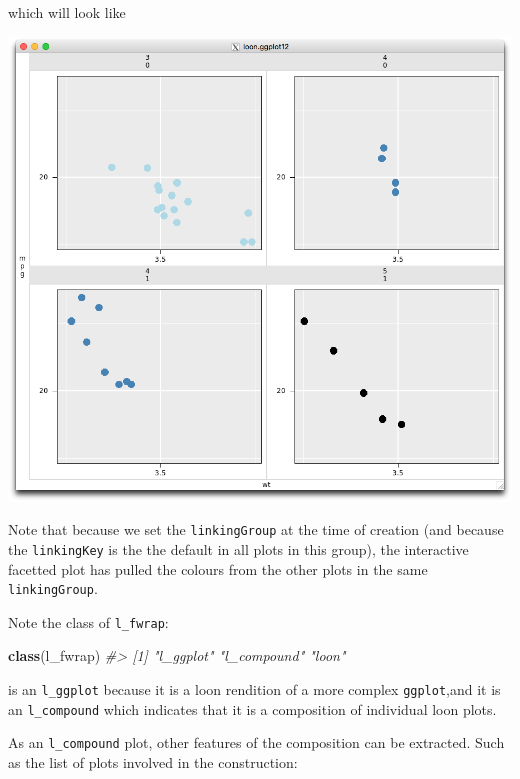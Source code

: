 \documentclass[]{article}
\newenvironment{Shaded}{\begin{snugshade}}{\end{snugshade}}
\newcommand{\KeywordTok}[1]{\textcolor[rgb]{0.13,0.29,0.53}{\textbf{#1}}}
\newcommand{\CommentTok}[1]{\textcolor[rgb]{0.56,0.35,0.01}{\textit{#1}}}
\newcommand{\NormalTok}[1]{#1}
\begin{document}
which will look like

\begin{center}\includegraphics[width=0.7\linewidth]{./img/ggplots2loon//l_fwrap} \end{center}

Note that because we set the \texttt{linkingGroup} at the time of
creation (and because the \texttt{linkingKey} is the the default in all
plots in this group), the interactive facetted plot has pulled the
colours from the other plots in the same \texttt{linkingGroup}.

Note the class of \texttt{l\_fwrap}:

\begin{Shaded}
\begin{Highlighting}[]
\KeywordTok{class}\NormalTok{(l_fwrap)}
\CommentTok{#> [1] "l_ggplot"   "l_compound" "loon"}
\end{Highlighting}
\end{Shaded}

is an \texttt{l\_ggplot} because it is a loon rendition of a more
complex \texttt{ggplot},and it is an \texttt{l\_compound} which
indicates that it is a composition of individual loon plots.

As an \texttt{l\_compound} plot, other features of the composition can
be extracted. Such as the list of plots involved in the construction:

\begin{Shaded}
\end{Shaded}
\end{document}
